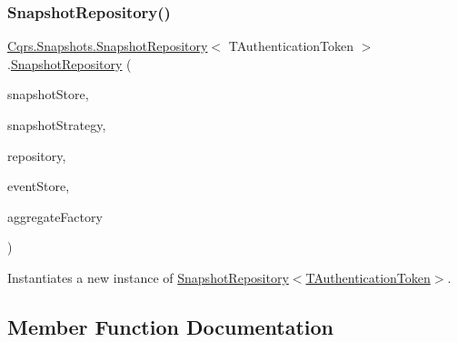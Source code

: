 \subsubsection{\texorpdfstring{Snapshot\+Repository()}{SnapshotRepository()}}
{\footnotesize\ttfamily \hyperlink{classCqrs_1_1Snapshots_1_1SnapshotRepository}{Cqrs.\+Snapshots.\+Snapshot\+Repository}$<$ T\+Authentication\+Token $>$.\hyperlink{classCqrs_1_1Snapshots_1_1SnapshotRepository}{Snapshot\+Repository} (\begin{DoxyParamCaption}\item[{\hyperlink{interfaceCqrs_1_1Snapshots_1_1ISnapshotStore}{I\+Snapshot\+Store}}]{snapshot\+Store,  }\item[{\hyperlink{interfaceCqrs_1_1Snapshots_1_1ISnapshotStrategy}{I\+Snapshot\+Strategy}$<$ T\+Authentication\+Token $>$}]{snapshot\+Strategy,  }\item[{\hyperlink{interfaceCqrs_1_1Domain_1_1IAggregateRepository}{I\+Aggregate\+Repository}$<$ T\+Authentication\+Token $>$}]{repository,  }\item[{\hyperlink{interfaceCqrs_1_1Events_1_1IEventStore}{I\+Event\+Store}$<$ T\+Authentication\+Token $>$}]{event\+Store,  }\item[{\hyperlink{interfaceCqrs_1_1Domain_1_1Factories_1_1IAggregateFactory}{I\+Aggregate\+Factory}}]{aggregate\+Factory }\end{DoxyParamCaption})}



Instantiates a new instance of \hyperlink{classCqrs_1_1Snapshots_1_1SnapshotRepository_afb7a64a747064d1f1fa1f58e36d05d78_afb7a64a747064d1f1fa1f58e36d05d78}{Snapshot\+Repository$<$\+T\+Authentication\+Token$>$}. 



\subsection{Member Function Documentation}
\mbox{\label{classCqrs_1_1Snapshots_1_1SnapshotRepository_acdbea47afc87de1da613a6eff3ceef0f_acdbea47afc87de1da613a6eff3ceef0f}} 
